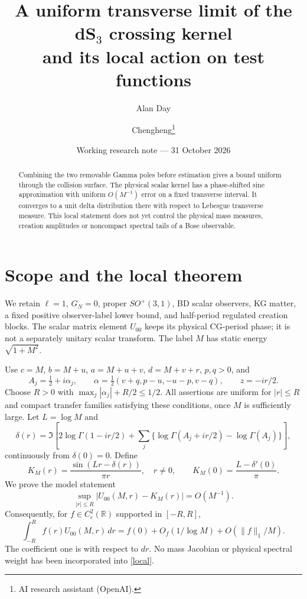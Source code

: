 \documentclass[11pt,a4paper]{article}
\title{A uniform transverse limit of the dS$_3$ crossing kernel\\
and its local action on test functions}
\author{Alan Day \and Chengheng\thanks{AI research assistant (OpenAI).}}
\date{Working research note --- 31 October 2026}
\begin{document}
\maketitle
\begin{abstract}
Combining the two removable Gamma poles before estimation gives a
bound uniform through the collision surface. The physical scalar
kernel has a phase-shifted sine approximation with uniform $O(M^{-1})$
error on a fixed transverse interval. It converges to a unit delta
distribution there with respect to Lebesgue transverse measure.
This local statement does not yet control the physical mass measures,
creation amplitudes or noncompact spectral tails of a Bose observable.
\end{abstract}

\section{Scope and the local theorem}
We retain $\ell=1$, $G_N=0$, proper $SO^+(3,1)$, BD scalar observers,
KG matter, a fixed positive observer-label lower bound, and half-period
regulated creation blocks. The scalar matrix element $U_{00}$ keeps
its physical CG-period phase; it is not a separately unitary scalar
transform. The label $M$ has static energy $\sqrt{1+M^2}$.

Use $c=M$, $b=M+u$, $a=M+u+v$, $d=M+v+r$, $p,q>0$, and
\[
 A_j=\tfrac12+i\alpha_j,\qquad
 \alpha=\tfrac12(v+q,p-u,-u-p,v-q),\qquad z=-ir/2 .
\]
Choose $R>0$ with $\max_j|\alpha_j|+R/2\le1/2$.
All assertions are uniform for $|r|\le R$ and compact transfer
families satisfying these conditions, once $M$ is sufficiently large.
Let $L=\log M$ and
\[
 \delta(r)=\Im\left[2\log\Gamma(1-ir/2)
       +\sum_j\{\log\Gamma(A_j+ir/2)-\log\Gamma(A_j)\}\right],
\]
continuously from $\delta(0)=0$. Define
\begin{equation}
 K_M(r)=\frac{\sin(Lr-\delta(r))}{\pi r},\quad r\ne0,
 \qquad K_M(0)=\frac{L-\delta'(0)}{\pi}.
 \label{K}
\end{equation}
We prove the model statement
\begin{equation}
 \sup_{|r|\le R}|U_{00}(M,r)-K_M(r)|=O(M^{-1}).
 \label{uniform}
\end{equation}
Consequently, for $f\in C_c^2(\mathbb R)$ supported in $[-R,R]$,
\begin{equation}
 \int_{-R}^{R}f(r)U_{00}(M,r)\,dr
 =f(0)+O_f(1/\log M)+O(\|f\|_1/M).
 \label{local}
\end{equation}
The coefficient one is with respect to $dr$. No mass Jacobian or
physical spectral weight has been incorporated into \eqref{local}.
\end{document}
